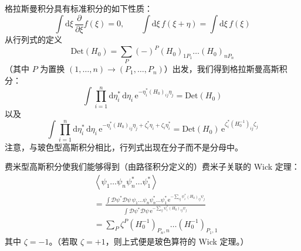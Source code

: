 格拉斯曼积分具有标准积分的如下性质：
\begin{equation*}
\int \mathrm{d}\xi\,\frac{\partial}{\partial\xi}f(\xi)=0,\qquad \int \mathrm{d}\xi\,f(\xi+\eta)=\int \mathrm{d}\xi\,f(\xi)
\end{equation*}
从行列式的定义
\begin{equation*}
\mathrm{Det}(H_{0})=\sum_{P}(-)^{P}(H_{0})_{1P_{1}}\dots(H_{0})_{nP_{n}}
\end{equation*}
（其中 $P$ 为置换 $(1,\dots,n)\to(P_{1},\dots,P_{n})$）出发，我们得到格拉斯曼高斯积分：
\begin{equation*}
\int \prod_{i=1}^{n}\mathrm{d}\eta_{i}^{*}\,\mathrm{d}\eta_{i}\,\mathrm{e}^{-\eta_{i}^{*}(H_{0})_{ij}\eta_{j}}=\mathrm{Det}(H_{0})
\end{equation*}
以及
\begin{equation*}
\int \prod_{i=1}^{n}\mathrm{d}\eta_{i}^{*}\,\mathrm{d}\eta_{i}\,\mathrm{e}^{-\eta_{i}^{*}(H_{0})_{ij}\eta_{j}+\zeta_{i}^{*}\eta_{i}+\zeta_{i}\eta_{i}^{*}}=\mathrm{Det}(H_{0})\,\mathrm{e}^{\zeta_{i}^{*}(H_{0}^{-1})_{ij}\zeta_{j}}
\end{equation*}
注意，与玻色型高斯积分相比，行列式出现在分子而不是分母中。

费米型高斯积分使我们能够得到（由路径积分定义的）费米子关联的 Wick 定理：
\begin{align*}
&\left\langle \psi_{1}\dots\psi_{n}\psi_{n}^{*}\dots\psi_{1}^{*}\right\rangle\\
&=\frac{\int \mathcal{D}\psi^{*}\mathcal{D}\psi\,\psi_{1}\dots\psi_{n}\psi_{n}^{*}\dots\psi_{1}^{*}\,\mathrm{e}^{-\sum_{ij}\psi_{i}^{*}(H_{0})_{ij}\psi_{j}}}{\int \mathcal{D}\psi^{*}\mathcal{D}\psi\,\mathrm{e}^{-\sum_{ij}\psi_{i}^{*}(H_{0})_{ij}\psi_{j}}}\\
&=\sum_{P}\zeta^{P}(H_{0}^{-1})_{P_{n},n}\dots(H_{0}^{-1})_{P_{1},1} \tag{5.4.1}
\end{align*}
其中 $\zeta=-1$。（若取 $\zeta=+1$，则上式便是玻色算符的 Wick 定理。）

